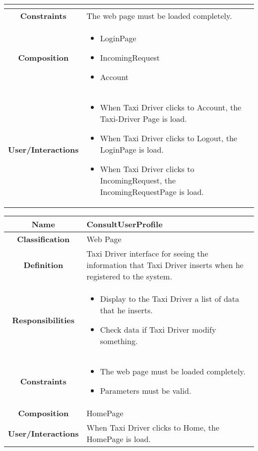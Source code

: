 \documentclass[11pt, a4paper,titlepage]{article}
\begin{document}
\begin{enumerate}
\begin{tabularx}{\textwidth}{| c | X |}
\begin{itemize}
	\end{itemize}
	\\
	\hline
	\textbf{Constraints} & The web page must be loaded completely.
	\\
	\hline
	\textbf{Composition} &
	\begin{itemize}
		\item LoginPage
		\item IncomingRequest
		\item Account
	\end{itemize}
	\\
	\hline
	\textbf{User/Interactions} &
	\begin{itemize}
		\item When Taxi Driver clicks to Account, the Taxi-Driver Page is load.    	
		\item When Taxi Driver clicks to Logout, the LoginPage is load.
		\item When Taxi Driver clicks to IncomingRequest, the IncomingRequestPage is load.
	\end{itemize}
	\\
	\hline 
\end{tabularx}
\begin{tabularx}{\textwidth}{| c | X |}
	\hline
	\textbf{Name} &
	ConsultUserProfile
	\\
	\hline
	\textbf{Classification} &
	Web Page
	\\
	\hline
	\textbf{Definition} &
	Taxi Driver interface for seeing the information that Taxi Driver inserts when he registered to the system.\\
	\hline
	\textbf{Responsibilities} &
	\begin{itemize}
		\item Display to the Taxi Driver a list of data that he inserts.
		\item Check data if Taxi Driver modify something.
	\end{itemize}
	\\
	\hline
	\textbf{Constraints} &
	\begin{itemize}
		\item  The web page must be loaded completely.
		\item Parameters must be valid.
	\end{itemize}
	\\
	\hline
	\textbf{Composition} & HomePage
	\\
	\hline
	\textbf{User/Interactions} &
	When Taxi Driver clicks to Home, the HomePage is load.
	\\
	\hline 
\end{tabularx}


\end{enumerate}
\end{document}

